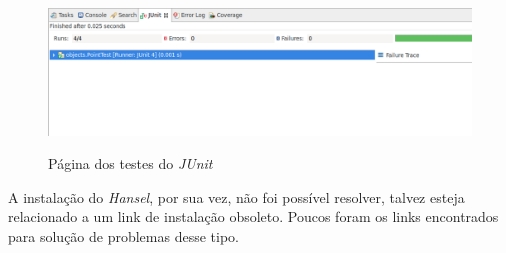 \begin{figure}[H]
    \caption{Página dos testes do \textit{JUnit}}
    \vspace{0.5cm}
    \centering
    \includegraphics[width=15cm]{imagens/clover_junit.png}
    \label{figura:clover_junit}
\end{figure}

A instalação do \textit{Hansel}, por sua vez, não foi possível resolver, talvez esteja relacionado a um link de instalação obsoleto. Poucos foram os links encontrados para solução de problemas desse tipo.
